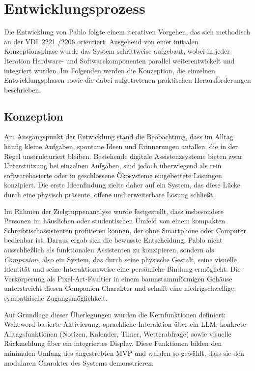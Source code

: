 \section{Entwicklungsprozess}

Die Entwicklung von Pablo folgte einem iterativen Vorgehen, das sich methodisch an der VDI~2221
/2206 orientiert.
Ausgehend von einer initialen Konzeptionsphase wurde das System schrittweise aufgebaut, wobei in jeder Iteration Hardware- und Softwarekomponenten parallel weiterentwickelt und integriert wurden.
Im Folgenden werden die Konzeption, die einzelnen Entwicklungsphasen sowie die dabei aufgetretenen praktischen Herausforderungen beschrieben.


\subsection{Konzeption}

Am Ausgangspunkt der Entwicklung stand die Beobachtung, dass im Alltag häufig kleine Aufgaben, spontane Ideen und Erinnerungen anfallen, die in der Regel unstrukturiert bleiben.
Bestehende digitale Assistenzsysteme bieten zwar Unterstützung bei einzelnen Aufgaben, sind jedoch überwiegend als rein softwarebasierte oder in geschlossene Ökosysteme eingebettete Lösungen konzipiert.
Die erste Ideenfindung zielte daher auf ein System, das diese Lücke durch eine physisch präsente, offene und erweiterbare Lösung schließt.

Im Rahmen der Zielgruppenanalyse wurde festgestellt, dass insbesondere Personen im häuslichen oder studentischen Umfeld von einem kompakten Schreibtischassistenten profitieren können, der ohne Smartphone oder Computer bedienbar ist.
Daraus ergab sich die bewusste Entscheidung, Pablo nicht ausschließlich als funktionalen Assistenten zu konzipieren, sondern als \textit{Companion}, also ein System, das durch seine physische Gestalt, seine visuelle Identität und seine Interaktionsweise eine persönliche Bindung ermöglicht.
Die Verkörperung als Pixel-Art-Faultier in einem baumstammförmigen Gehäuse unterstreicht diesen Companion-Charakter und schafft eine niedrigschwellige, sympathische Zugangsmöglichkeit.

Auf Grundlage dieser Überlegungen wurden die Kernfunktionen definiert: Wakeword-basierte Aktivierung, sprachliche Interaktion über ein LLM, konkrete Alltagsfunktionen (Notizen, Kalender, Timer, Wetterabfrage) sowie visuelle Rückmeldung über ein integriertes Display.
Diese Funktionen bilden den minimalen Umfang des angestrebten MVP und wurden so gewählt, dass sie den modularen Charakter des Systems demonstrieren.


